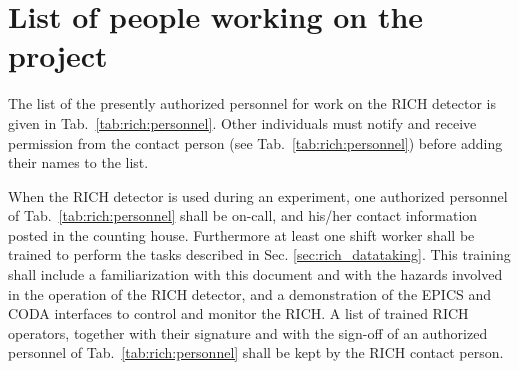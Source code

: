 \section{List of people working on the project} 
 
The list
of the presently authorized personnel for work on the RICH detector 
is given in Tab.~\ref{tab:rich:personnel}.
Other individuals must notify and receive permission from
the contact person (see Tab.~\ref{tab:rich:personnel}) before adding their names 
to the list. 

When the RICH detector is used during an experiment, one authorized personnel of 
Tab.~\ref{tab:rich:personnel} shall be on-call, and his/her contact information
posted in the counting house. Furthermore at least one shift worker shall be 
trained to perform the tasks described in Sec. \ref{sec:rich_datataking}. 
This training shall include a familiarization with this document and with 
the hazards involved in the operation of the RICH detector, and a demonstration
of the EPICS and CODA interfaces to control and monitor the RICH.
A list of trained RICH operators, together with their signature and 
with the sign-off of an authorized personnel of Tab.~\ref{tab:rich:personnel}
shall be kept by the RICH contact person.


